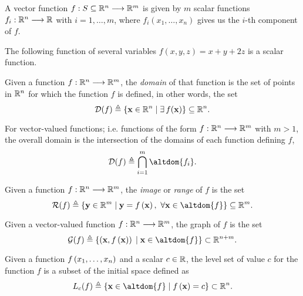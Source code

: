 \begin{remark}
	A vector function $\appl{f}{S\subseteq\Rtn}{\R^m}$ is given by $m$ scalar functions $\appl{f_i}{\Rtn}{\R}$ with $i = 1, \ldots,
	m$, where $f_i(x_1, \ldots, x_n)$ gives us the $i$-th component of $f$.
\end{remark}

\begin{example}
    The following function of several variables $f(x, y, z) = x + y + 2z$ is a scalar function.
\end{example}


\begin{defn}[Domain]
Given a function $\stdvf$, the \textit{domain} of that function is the set of points in $\Rtn$ for which the function $f$ is 
defined, in other words, the set
\begin{equation}
\dom{f} \bydef \{\vec{x}\in\Rtn\st\exists f(\vec{x})\}\subseteq\Rtn.
\end{equation}
\end{defn}

\noindent For vector-valued functions; i.e. functions of the form $\stdvf$ with $m > 1$, the overall domain is the intersection of the
domains of each function defining $f$,
\begin{equation}
\dom{f}\bydef\bigcap_{i=1}^m\altdom{f_i}.
\end{equation}

\begin{defn}[Image]
Given a function $\stdvf$, the \textit{image} or \textit{range} of $f$ is the set
\begin{equation}
\image{f}\bydef\{\vec{y}\in\R^m\st \vec{y} = f\left(\vec{x}\right),\ \forall\vec{x}\in\altdom{f}\}\subseteq\R^m.
\end{equation}
\end{defn}

\begin{defn}[Graph]
Given a vector-valued function $\stdvf$, the graph of $f$ is the set
\begin{equation}
\fgraph{f}\bydef\{\left(\vec{x}, f\left(\vec{x}\right)\right)\st\vec{x}\in\altdom{f}\}\subset\R^{n + m}.
\end{equation}
\end{defn}

\begin{defn}
Given a function $f\left(x_1, \ldots, x_n\right)$ and a scalar $c\in\R$, the level set of value $c$ for the function $f$ is a subset of the initial space
defined as
\begin{equation}
\levelset{c}{f} \bydef \{\vec{x}\in\altdom{f}\st f\left(\vec{x}\right) = c\}\subset\Rtn.
\end{equation}
\end{defn}


